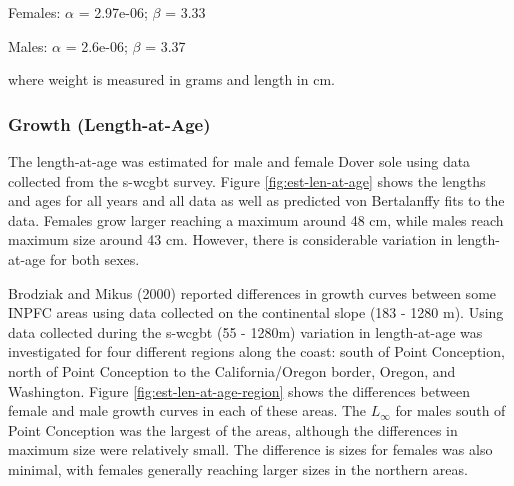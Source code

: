 \documentclass[11pt,
  english,
  a4paper,
]{article}
\begin{document}
\leavevmode\tagmcend\tagstructend\par

\begin{centering}

Females: $\alpha$ = 2.97e-06; $\beta$ = 3.33

Males: $\alpha$ = 2.6e-06; $\beta$ = 3.37

\end{centering}


where weight is measured in grams and length in cm.

\leavevmode\tagmcend\tagstructend\par


\hypertarget{growth-length-at-age}{%
\subsubsection{Growth (Length-at-Age)}\label{growth-length-at-age}}

\leavevmode\tagmcend\tagstructend


The length-at-age was estimated for male and female Dover sole using data collected from the \Gls{s-wcgbt} survey. Figure \ref{fig:est-len-at-age} shows the lengths and ages for all years and all data as well as predicted von Bertalanffy fits to the data. Females grow larger reaching a maximum around 48 cm, while males reach maximum size around 43 cm. However, there is considerable variation in length-at-age for both sexes.

\leavevmode\tagmcend\tagstructend\par


Brodziak and Mikus {(2000)\leavevmode\tagmcend\tagstructend} reported differences in growth curves between some INPFC areas using data collected on the continental slope (183 - 1280 m). Using data collected during the \Gls{s-wcgbt} (55 - 1280m) variation in length-at-age was investigated for four different regions along the coast: south of Point Conception, north of Point Conception to the California/Oregon border, Oregon, and Washington. Figure \ref{fig:est-len-at-age-region} shows the differences between female and male growth curves in each of these areas. The {\(L_{\infty}\)\leavevmode\tagmcend\tagstructend} for males south of Point Conception was the largest of the areas, although the differences in maximum size were relatively small. The difference is sizes for females was also minimal, with females generally reaching larger sizes in the northern areas.
\end{document}
